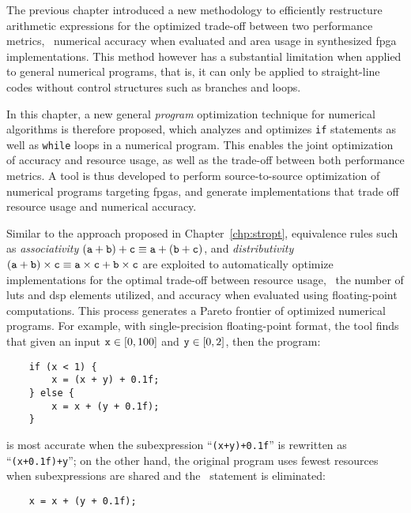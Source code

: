 The previous chapter introduced a new methodology to efficiently restructure
arithmetic expressions for the optimized trade-off between two performance
metrics, \ie~numerical accuracy when evaluated and area usage in synthesized
\gls{fpga} implementations.  This method however has a substantial limitation
when applied to general numerical programs, that is, it can only be applied to
straight-line codes without control structures such as branches and loops.

In this chapter, a new general \emph{program} optimization technique for
numerical algorithms is therefore proposed, which analyzes and optimizes
\texttt{if} statements as well as \texttt{while} loops in a numerical program.
This enables the joint optimization of accuracy and resource usage, as well
as the trade-off between both performance metrics.  A tool is thus developed
to perform source-to-source optimization of numerical programs targeting
\glspl{fpga}, and generate implementations that trade off resource usage and
numerical accuracy.


Similar to the approach proposed in Chapter~\ref{chp:stropt}, equivalence rules
such as \emph{associativity} $(\texttt{a} + \texttt{b}) + \texttt{c} \equiv \texttt{a} + (\texttt{b} +
\texttt{c})$, and \emph{distributivity} $(\texttt{a} + \texttt{b}) \times \texttt{c} \equiv \texttt{a}
\times \texttt{c} + \texttt{b} \times \texttt{c}$ are exploited to automatically optimize
implementations for the optimal trade-off between resource usage, \ie~the
number of \glspl{lut} and \gls{dsp} elements utilized, and accuracy when
evaluated using floating-point computations.  This process generates a Pareto
frontier of optimized numerical programs.  For example, with single-precision
floating-point format, the tool finds that given an input $\texttt{x} \in [0, 100]$
and $\texttt{y} \in [0, 2]$, then the program:
\begin{minipage}{\linewidth}
\begin{lstlisting}
    if (x < 1) {
        x = (x + y) + 0.1f;
    } else {
        x = x + (y + 0.1f);
    }
\end{lstlisting}
\end{minipage}
is most accurate when the subexpression ``\verb|(x+y)+0.1f|'' is rewritten
as ``\verb|(x+0.1f)+y|''; on the other hand, the original program uses
fewest resources when subexpressions are shared and the \iflit~statement is
eliminated:
\begin{lstlisting}
    x = x + (y + 0.1f);
\end{lstlisting}

